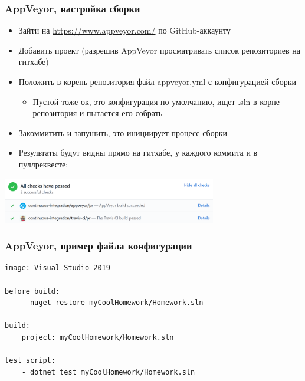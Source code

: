 \documentclass[xetex,mathserif,serif]{beamer}
\begin{document}
    \begin{frame}
        \frametitle{AppVeyor, настройка сборки}
        \begin{itemize}
            \item Зайти на \url{https://www.appveyor.com/} по GitHub-аккаунту
            \item Добавить проект (разрешив AppVeyor просматривать список репозиториев на гитхабе)
            \item Положить в корень репозитория файл appveyor.yml с конфигурацией сборки
            \begin{itemize}
                \item Пустой тоже ок, это конфигурация по умолчанию, ищет .sln в корне репозитория и пытается его собрать
            \end{itemize}
            \item Закоммитить и запушить, это инициирует процесс сборки
            \item Результаты будут видны прямо на гитхабе, у каждого коммита и в пуллреквесте:
        \end{itemize}
        \begin{center}
            \includegraphics[width=0.7\textwidth]{appVeyorSuccess.png}
        \end{center}
    \end{frame}

    \begin{frame}[fragile]
        \frametitle{AppVeyor, пример файла конфигурации}
        \begin{verbatim}
image: Visual Studio 2019

before_build: 
    - nuget restore myCoolHomework/Homework.sln

build: 
    project: myCoolHomework/Homework.sln

test_script: 
    - dotnet test myCoolHomework/Homework.sln
        \end{verbatim}
    \end{frame}
\end{document}
